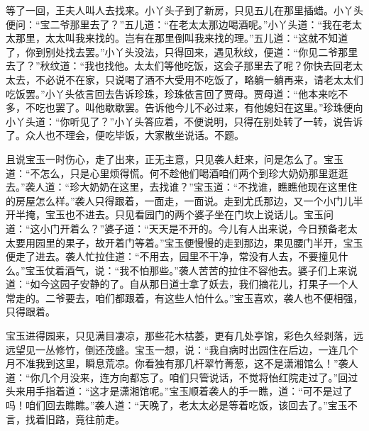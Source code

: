 \begin{parag}
\end{parag}


\begin{parag}
    等了一回，王夫人叫人去找来。小丫头子到了新房，只见五儿在那里插蜡。小丫头便问：“宝二爷那里去了？”五儿道：“在老太太那边喝酒呢。”小丫头道：“我在老太太那里，太太叫我来找的。岂有在那里倒叫我来找的理。”五儿道：“这就不知道了，你到别处找去罢。”小丫头没法，只得回来，遇见秋纹，便道：“你见二爷那里去了？”秋纹道：“我也找他。太太们等他吃饭，这会子那里去了呢？你快去回老太太去，不必说不在家，只说喝了酒不大受用不吃饭了，略躺一躺再来，请老太太们吃饭罢。”小丫头依言回去告诉珍珠，珍珠依言回了贾母。贾母道：“他本来吃不多，不吃也罢了。叫他歇歇罢。告诉他今儿不必过来，有他媳妇在这里。”珍珠便向小丫头道：“你听见了？”小丫头答应着，不便说明，只得在别处转了一转，说告诉了。众人也不理会，便吃毕饭，大家散坐说话。不题。
\end{parag}


\begin{parag}
    且说宝玉一时伤心，走了出来，正无主意，只见袭人赶来，问是怎么了。宝玉道：“不怎么，只是心里烦得慌。何不趁他们喝酒咱们两个到珍大奶奶那里逛逛去。”袭人道：“珍大奶奶在这里，去找谁？”宝玉道：“不找谁，瞧瞧他现在这里住的房屋怎么样。”袭人只得跟着，一面走，一面说。走到尤氏那边，又一个小门儿半开半掩，宝玉也不进去。只见看园门的两个婆子坐在门坎上说话儿。宝玉问道：“这小门开着么？”婆子道：“天天是不开的。今儿有人出来说，今日预备老太太要用园里的果子，故开着门等着。”宝玉便慢慢的走到那边，果见腰门半开，宝玉便走了进去。袭人忙拉住道：“不用去，园里不干净，常没有人去，不要撞见什么。”宝玉仗着酒气，说：“我不怕那些。”袭人苦苦的拉住不容他去。婆子们上来说道：“如今这园子安静的了。自从那日道士拿了妖去，我们摘花儿，打果子一个人常走的。二爷要去，咱们都跟着，有这些人怕什么。”宝玉喜欢，袭人也不便相强，只得跟着。
\end{parag}


\begin{parag}
    宝玉进得园来，只见满目凄凉，那些花木枯萎，更有几处亭馆，彩色久经剥落，远远望见一丛修竹，倒还茂盛。宝玉一想，说：“我自病时出园住在后边，一连几个月不准我到这里，瞬息荒凉。你看独有那几杆翠竹菁葱，这不是潇湘馆么！”袭人道：“你几个月没来，连方向都忘了。咱们只管说话，不觉将怡红院走过了。”回过头来用手指着道：“这才是潇湘馆呢。”宝玉顺着袭人的手一瞧，道：“可不是过了吗！咱们回去瞧瞧。”袭人道：“天晚了，老太太必是等着吃饭，该回去了。”宝玉不言，找着旧路，竟往前走。
\end{parag}



